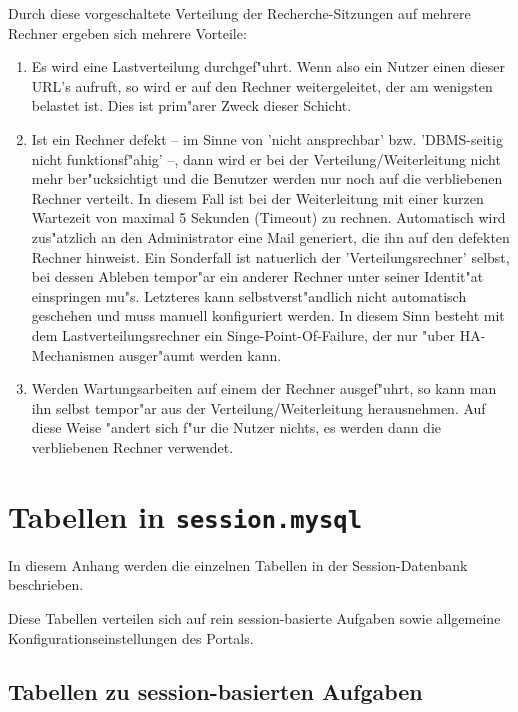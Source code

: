 \documentclass[11pt, twoside, a4paper, BCOR8mm, DIV12, bibtotoc,idxtotoc]{scrbook}
\begin{document}
Durch diese vorgeschaltete Verteilung der Recherche-Sitzungen auf
mehrere Rechner ergeben sich mehrere Vorteile:

\begin{enumerate}
\item Es wird eine Lastverteilung durchgef"uhrt. Wenn also ein Nutzer
  einen dieser URL's aufruft, so wird er auf den Rechner
  weitergeleitet, der am wenigsten belastet ist.  Dies ist prim"arer
  Zweck dieser Schicht.
\item Ist ein Rechner defekt -- im Sinne von 'nicht ansprechbar'
  bzw. 'DBMS-seitig nicht funk\-tions\-f"a\-hig' --, dann wird er bei der
  Verteilung/Weiterleitung nicht mehr ber"ucksichtigt und die Benutzer
  werden nur noch auf die verbliebenen Rechner verteilt. In diesem
  Fall ist bei der Weiterleitung mit einer kurzen Wartezeit von
  maximal 5 Sekunden (Timeout) zu rechnen.  Automatisch wird
  zus"atzlich an den Administrator eine Mail ge\-ne\-riert, die ihn
  auf den defekten Rechner hinweist. Ein Sonderfall ist natuerlich der
  'Verteilungs\-rech\-ner' selbst, bei dessen Ableben tempor"ar ein
  anderer Rechner unter seiner Identit"at einspringen mu"s. Letzteres
  kann selbstverst"andlich nicht automatisch geschehen und muss
  manuell konfiguriert werden. In diesem Sinn besteht mit dem
  Lastverteilungsrechner ein Singe-Point-Of-Failure, der nur "uber
  HA-Mechanismen ausger"aumt werden kann.
\item Werden Wartungsarbeiten auf einem der Rechner ausgef"uhrt, so
  kann man ihn selbst tempor"ar aus der Verteilung/Weiterleitung
  herausnehmen. Auf diese Weise "andert sich f"ur die Nutzer nichts,
  es werden dann die verbliebenen Rechner verwendet.
\end{enumerate}

\appendix

\chapter{Tabellen in \texttt{session.mysql}}

In diesem Anhang werden die einzelnen Tabellen in der
Session-Datenbank beschrieben.

Diese Tabellen verteilen sich auf rein session-basierte Aufgaben sowie
allgemeine Konfigurations\-ein\-stellungen des Portals.


\section{Tabellen zu session-basierten Aufgaben}
\end{document}
